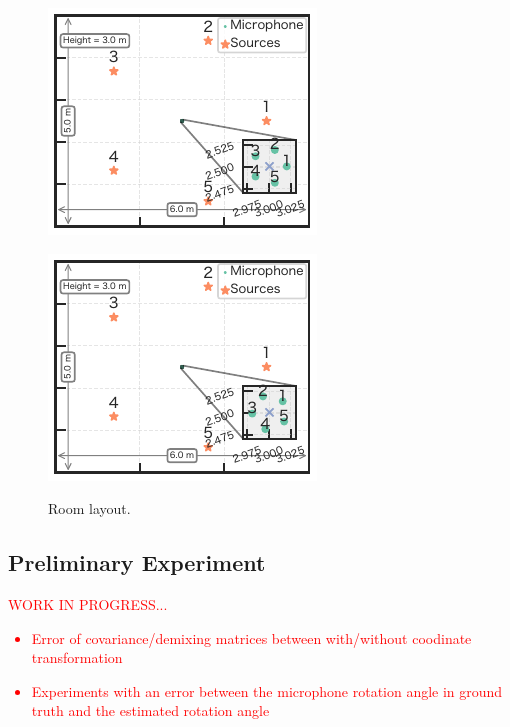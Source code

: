 \documentclass[sip,biber]{now-journal}
\newcommand{\todo}[1]{\textcolor{red}{#1}}
\begin{document}
\begin{figure}[t]
  \centering
  \begin{minipage}[t]{.45\linewidth}
    \centering\includegraphics{figures/room_layout_000.pdf}\label{fig:room:ref}
  \end{minipage}
  \begin{minipage}[t]{.45\linewidth}
    \centering\includegraphics{figures/room_layout_040.pdf}\label{fig:room:rot}
  \end{minipage}
  \caption{Room layout.}%
  \label{fig:layout}
\end{figure}

\subsection{Preliminary Experiment}
\todo{%
  WORK IN PROGRESS...
\begin{itemize}
  \item Error of covariance/demixing matrices between with/without coodinate transformation%
  \item Experiments with an error between the microphone rotation angle in ground truth and the estimated rotation angle%
\end{itemize}
}
\end{document}
